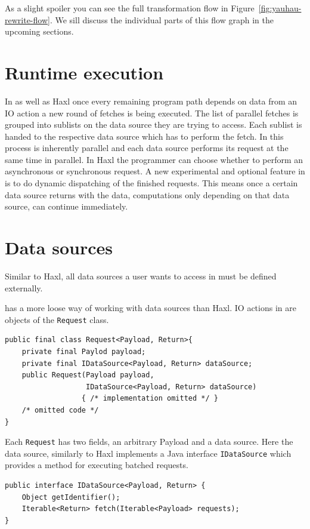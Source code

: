 As a slight spoiler you can see the full \yauhau{} transformation flow in Figure~\ref{fig:yauhau-rewrite-flow}.
We sill discuss the individual parts of this flow graph in the upcoming sections.

\section{Runtime execution}

In \yauhau{} as well as Haxl once every remaining program path depends on data from an IO action a new round of fetches is being executed.
The list of parallel fetches is grouped into sublists on the data source they are trying to access.
Each sublist is handed to the respective data source which has to perform the fetch.
In \yauhau{} this process is inherently parallel and each data source performs its request at the same time in parallel.
In Haxl the programmer can choose whether to perform an asynchronous or synchronous request.
A new experimental and optional feature in \yauhau{} is to do dynamic dispatching of the finished requests.
This means once a certain data source returns with the data, computations only depending on that data source, can continue immediately.

\section{Data sources}

Similar to Haxl, all data sources a user wants to access in \yauhau{} must be defined externally.

\yauhau{} has a more loose way of working with data sources than Haxl.
IO actions in \yauhau{} are objects of the \texttt{Request} class.

\begin{verbatim}
public final class Request<Payload, Return>{
    private final Paylod payload;
    private final IDataSource<Payload, Return> dataSource;
    public Request(Payload payload,
                   IDataSource<Payload, Return> dataSource)
                  { /* implementation omitted */ }
    /* omitted code */
}
\end{verbatim}

Each \texttt{Request} has two fields, an arbitrary Payload and a data source.
Here the data source, similarly to Haxl implements a Java interface \texttt{IDataSource} which provides a method for executing batched requests.

\begin{verbatim}
public interface IDataSource<Payload, Return> {
    Object getIdentifier();
    Iterable<Return> fetch(Iterable<Payload> requests);
}
\end{verbatim}

